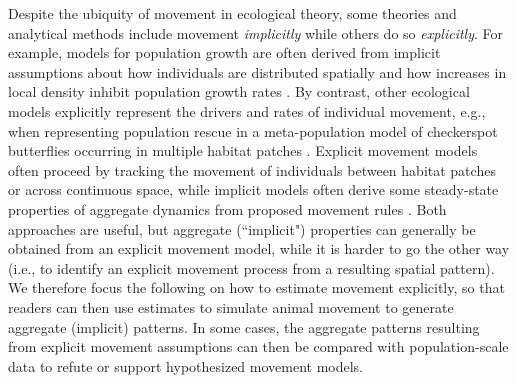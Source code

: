 Despite the ubiquity of movement in ecological theory, some theories and analytical methods include movement \textit{implicitly} while others do so \textit{explicitly}.  For example, models for population growth are often derived from implicit assumptions about how individuals are distributed spatially and how increases in local density inhibit population growth rates \cite{roughgarden_production_1997}.  By contrast, other ecological models explicitly represent the drivers and rates of individual movement, e.g., when representing population rescue in a meta-population model of checkerspot butterflies occurring in multiple habitat patches \cite{hanski_ecological_2017}.  Explicit movement models often proceed by tracking the movement of individuals between habitat patches or across continuous space, while implicit models often derive some steady-state properties of aggregate dynamics from proposed movement rules \cite{levin_theories_1997}.  Both approaches are useful, but aggregate (``implicit") properties can generally be obtained from an explicit movement model, while it is harder to go the other way (i.e., to identify an explicit movement process from a resulting spatial pattern).  We therefore focus the following on how to estimate movement explicitly, so that readers can then use estimates to simulate animal movement to generate aggregate (implicit) patterns.  In some cases, the aggregate patterns resulting from explicit movement assumptions can then be compared with population-scale data to refute or support hypothesized movement models.  

